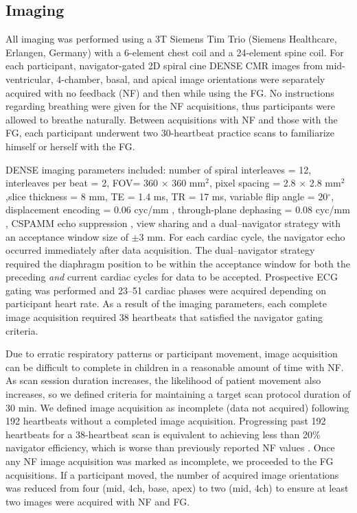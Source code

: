 \subsection{Imaging}
	All imaging was performed using a 3T Siemens Tim Trio (Siemens Healthcare, Erlangen, Germany) with a 6-element chest coil and a 24-element spine coil. For each participant, navigator-gated 2D spiral cine DENSE CMR \cite{Zhong2010a,Wehner2015} images from mid-ventricular, 4-chamber, basal, and apical image orientations were separately acquired with no feedback (NF) and then while using the FG. No instructions regarding breathing were given for the NF acquisitions, thus participants were allowed to breathe naturally. Between acquisitions with NF and those with the FG, each participant underwent two 30-heartbeat practice scans to familiarize himself or herself with the FG.
	
	DENSE imaging parameters included: number of spiral interleaves = 12, interleaves per beat = 2, FOV= 360 × 360 mm$^2$, pixel spacing = 2.8 × 2.8 mm$^2$,slice thickness = 8 mm, TE = 1.4 ms, TR = 17 ms, variable flip angle = 20$^{\circ}$, displacement encoding = 0.06 cyc/mm \cite{Wehner2015a}, through-plane dephasing = 0.08 cyc/mm \cite{Zhong2006a}, CSPAMM echo suppression \cite{Kim2004}, view sharing and a dual--navigator strategy \cite{Hamlet2016a} with an acceptance window size of $\pm$3 mm. For each cardiac cycle, the navigator echo occurred immediately after data acquisition. The dual--navigator strategy required the diaphragm position to be within the acceptance window for both the preceding \textit{and} current cardiac cycles for data to be accepted. Prospective ECG gating was performed and 23--51 cardiac phases were acquired depending on participant heart rate. As a result of the imaging parameters, each complete image acquisition required 38 heartbeats that satisfied the navigator gating criteria.
	
	Due to erratic respiratory patterns or participant movement, image acquisition can be difficult to complete in children in a reasonable amount of time with NF. As scan session duration increases, the likelihood of patient movement also increases, so we defined criteria for maintaining a target scan protocol duration of 30 min. We defined image acquisition as incomplete (data not acquired) following 192 heartbeats without a completed image acquisition. Progressing past 192 heartbeats for a 38-heartbeat scan is equivalent to achieving less than 20\% navigator efficiency, which is worse than previously reported NF values \cite{Abd-Elmoniem2011,Feuerlein2009,Jhooti2011,Wang1996}. Once any NF image acquisition was marked as incomplete, we proceeded to the FG acquisitions. If a participant moved, the number of acquired image orientations was reduced from four (mid, 4ch, base, apex) to two (mid, 4ch) to ensure at least two images were acquired with NF and FG.

